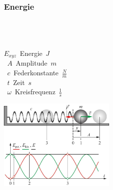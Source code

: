 \subsubsection{Energie}
\begin{center}
	\begin{minipage}{0.2\textwidth}
		 \\
		 \\
		 \\
		
		\unit{$E_{xyz}$}{Energie}{$J$} \\
		\unit{$A$}{Amplitude}{$m$} \\
		\unit{$c$}{Federkonstante}{$\frac{N}{m}$} \\
		\unit{$t$}{Zeit}{$s$} \\
		\unit{$\omega$}{Kreisfrequenz}{$\frac{1}{s}$}
	\end{minipage}%
	\begin{minipage}{0.3\textwidth}
		\includegraphics[height=4.5cm,keepaspectratio=true]{Images/schwingung_energie.png}
	\end{minipage}
\end{center}




